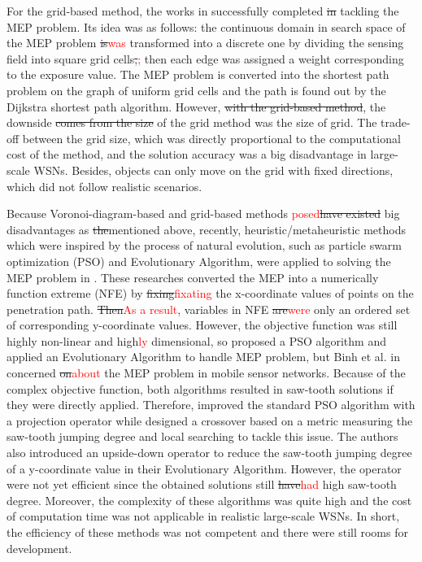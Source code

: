 \documentclass[final]{elsarticle}
\begin{document}
For the grid-based method, the works in \cite{meguerdichian2001exposure, veltri2003minimal,megerian2002exposure, b9, b10} successfully completed \sout{in} tackling the MEP problem. Its idea was as follows: the continuous domain in search space of the MEP problem \sout{is}\textcolor{red}{was} transformed into a discrete one by dividing the sensing field into square grid cells\sout{,}\textcolor{red}{;} then each edge was assigned a weight corresponding to the exposure value. The MEP problem is converted into the shortest path problem on the graph of uniform grid cells and the path is found out by the Dijkstra shortest path algorithm. However, \sout{with the grid-based method}, the downside \sout{comes from the size} of the grid method was the size of grid. The trade-off between the grid size, which was directly proportional to the computational cost of the method, and the solution accuracy was a big disadvantage in large-scale WSNs. Besides, objects can only move on the grid with fixed directions, which did not follow realistic scenarios.

Because Voronoi-diagram-based and grid-based methods \textcolor{red}{posed}\sout{have existed} big disadvantages as \sout{the}mentioned above, recently, heuristic/metaheuristic methods which were inspired by the process of natural evolution, such as particle swarm optimization (PSO) and Evolutionary Algorithm, were applied to solving the MEP problem in \cite{b11,b12,b25,binh2019efficient}. These researches converted the MEP into a numerically function extreme (NFE) \cite{b8} by \sout{fixing}\textcolor{red}{fixating} the x-coordinate values of points on the penetration path. \sout{Then}\textcolor{red}{As a result}, variables in NFE \sout{are}\textcolor{red}{were} only an ordered set of corresponding y-coordinate values. However, the objective function was still highly non-linear and high\textcolor{red}{ly} dimensional, so \cite{b11} proposed a PSO algorithm and \cite {b12,b25,binh2019efficient} applied an Evolutionary Algorithm to handle MEP problem, but Binh et al. in \cite{b25} concerned \sout{on}\textcolor{red}{about} the MEP problem in mobile sensor networks. Because of the complex objective function, both algorithms resulted in saw-tooth solutions if they were directly applied. Therefore, \cite{b11} improved the standard PSO algorithm with a projection operator while \cite{binh2019efficient} designed a crossover based on a metric measuring the saw-tooth jumping degree and local searching to tackle this issue. The authors \cite{b12} also introduced an upside-down operator to reduce the saw-tooth jumping degree of a y-coordinate value in their Evolutionary Algorithm. However, the operator were not yet efficient since the obtained solutions still \sout{have}\textcolor{red}{had} high saw-tooth degree. Moreover, the complexity of these algorithms was quite high and the cost of computation time was not applicable in realistic large-scale WSNs. In short, the efficiency of these methods was not competent and there were still rooms for development.
\end{document}
